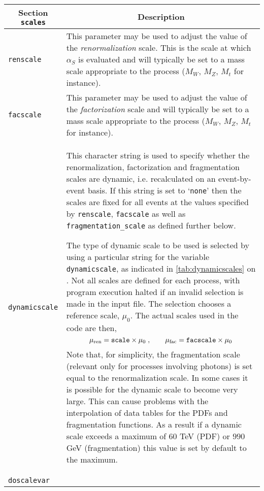 	\begin{longtable}{p{1.5cm}p{12cm}}
		\toprule
		\multicolumn{1}{c}{{\textbf{Section} \texttt{scales}}} & \multicolumn{1}{c}{{\textbf{Description}}} \\ 
		\midrule
		\texttt{renscale} &
		This parameter may be used to adjust the value
		of the {\it renormalization} scale. This is the scale
		at which $\alpha_S$ is evaluated and will typically be set to
		a mass scale appropriate to the process ($M_W$, $M_Z$, $M_t$ for
		instance). \\
		\texttt{facscale} &
		This parameter may be used to adjust the value
		of the {\it factorization} scale and will typically be set to
		a mass scale appropriate to the process ($M_W$, $M_Z$, $M_t$ for
		instance). \\
		\texttt{dynamicscale} &
		This character string is used to specify whether
		the renormalization, factorization and fragmentation scales are dynamic, i.e. recalculated
		on an event-by-event basis. If this string is set to `{\tt none}' then the scales
		are fixed for all events at the values	specified by {\tt renscale}, {\tt facscale}
		as well as \texttt{fragmentation\_scale} as defined further below.
		
		The type of dynamic scale to be used is selected by using a particular string
		for the variable {\tt dynamicscale}, as indicated in \cref{tab:dynamicscales} on \cpageref{tab:dynamicscales}.
		Not all scales are defined for each process, with program execution halted if
		an invalid selection is made in the input file.
		The selection chooses a reference scale, $\mu_0$. The actual scales used in
		the code are then,
		\begin{equation}
		\mu_{\mathrm{ren}} = {\tt scale} \times \mu_0 \;, \qquad
		\mu_{\mathrm{fac}} = {\tt facscale} \times \mu_0
		\label{eq:dynscale}
		\end{equation}
		Note that, for simplicity, the fragmentation scale (relevant only for processes
		involving photons) is set equal to the renormalization scale.
		In some cases it is possible for the dynamic scale to become very large. This can cause problems 
		with the interpolation of data tables for the PDFs and fragmentation functions. As a result if a dynamic scale 
		exceeds a maximum of $60$ TeV (PDF) or $990$ GeV (fragmentation) this value is set by default to the maximum. 	
		\\
		\texttt{doscalevar} &
		

\end{longtable}
